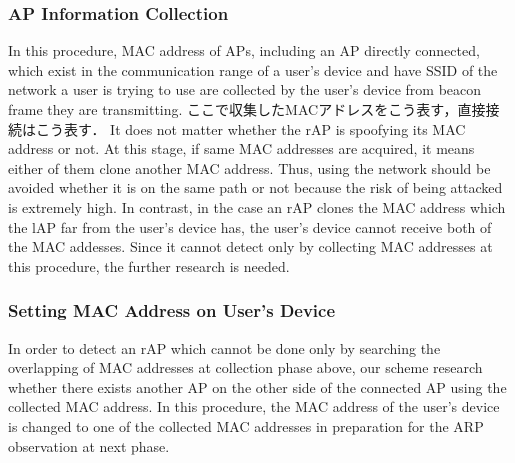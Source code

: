 \documentclass[conference]{IEEEtran}
\begin{document}
\subsubsection{AP Information Collection}
In this procedure, MAC address of APs, including an AP directly connected, which exist in the communication range of a user's device and have SSID of the network a user is trying to use are collected by the user's device from beacon frame they are transmitting.
ここで収集したMACアドレスをこう表す，直接接続はこう表す．
It does not matter whether the rAP is spoofying its MAC address or not.
At this stage, if same MAC addresses are acquired, it means either of them clone another MAC address.
Thus, using the network should be avoided whether it is on the same path or not because the risk of being attacked is extremely high. 
In contrast, in the case an rAP clones the MAC address which the lAP far from the user's device has, the user's device cannot receive both of the MAC addesses.
Since it cannot detect only by collecting MAC addresses at this procedure, the further research is needed.

\subsubsection{Setting MAC Address on User's Device}
In order to detect an rAP which cannot be done only by searching the overlapping of MAC addresses at collection phase above, our scheme research whether there exists another AP on the other side of the connected AP using the collected MAC address.
In this procedure, the MAC address of the user's device is changed to one of the collected MAC addresses in preparation for the ARP observation at next phase.
\end{document}

